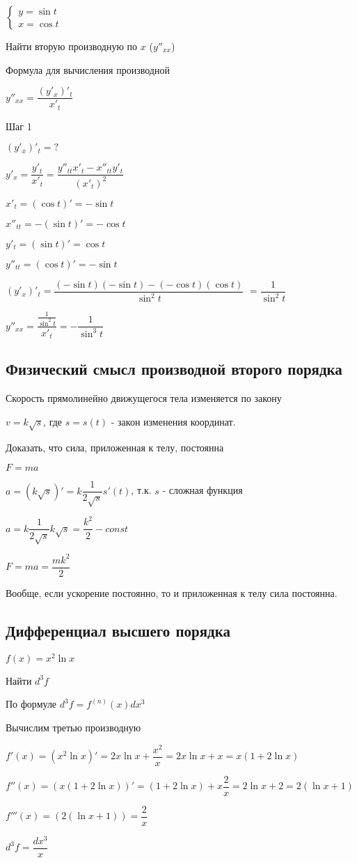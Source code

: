$\begin{cases}
y = \sin t \\
x = \cos t
\end{cases}$

Найти вторую производную по $ x $ ($ y''_{xx} $)

Формула для вычисления производной

$ y''_{xx} = \dfrac{(y'_{x})'_{t}}{x'_{t}}$


Шаг 1

$ (y'_{x})'_{t} = ? $

$ y'_{x} = \dfrac{y'_{t}}{x'_{t}} = \dfrac{y''_{tt}x'_{t} - x''_{tt}y'_{t} }{(x'_{t})^{2}} $

$ x'_{t} = (\cos t)' = -\sin t$

$x''_{tt} = -(\sin t)' = -\cos t $

$ y'_{t} = (\sin t)' = \cos t$

$y''_{tt} = (\cos t)' = - \sin t $

$ (y'_{x})'_{t} = \dfrac{(- \sin t)(- \sin t) - (- \cos t)(\cos t) }{\sin^{2} t} $
$ = \dfrac{1}{\sin^{2} t} $

$ y''_{xx} = \dfrac{\frac{1}{\sin^{2} t}}{x'_{t}} = - \dfrac{1}{\sin^{3} t} $

\subsection{Физический смысл производной второго порядка}

Скорость прямолинейно движущегося тела изменяется по закону

$ v = k\sqrt{s} $, где $ s = s(t) $ - закон изменения координат.

Доказать, что сила, приложенная к телу, постоянна

$ F = ma $

$ a = (k\sqrt{s})' = k \dfrac{1}{2\sqrt{s}} s'(t)$, т.к. $ s $ - сложная функция

$ a = k \dfrac{1}{2\sqrt{s}} k\sqrt{s} = \dfrac{k^{2}}{2} - const$ 

$ F = ma = \dfrac{mk^{2}}{2} $

Вообще, если ускорение постоянно, то и приложенная к телу сила постоянна.


\subsection{Дифференциал высшего порядка}

$ f(x) = x^{2} \ln x $

Найти $ d^{3}f $

По формуле $ d^{3}f = f^{(n)}(x) dx^{3} $

Вычислим третью производную

$ f'(x) = (x^{2} \ln x)' = 2x \ln x + \dfrac{x^{2}}{x} = 2x \ln x + x = x(1 + 2 \ln x) $

$ f''(x) = (x(1 + 2 \ln x))' = (1 + 2 \ln x) + x \dfrac{2}{x} = 2 \ln x + 2 = 2 (\ln x + 1) $

$ f'''(x) = (2 (\ln x + 1)) = \dfrac{2}{x} $

$ d^{3}f = \dfrac{dx^{3}}{x} $